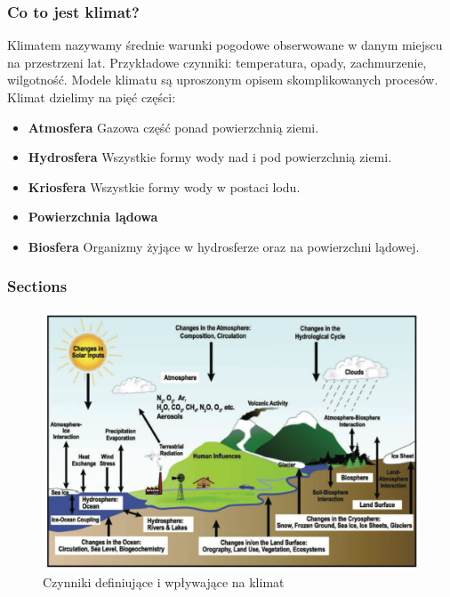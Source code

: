 \documentclass{beamer}
\begin{document}
\begin{frame}
\frametitle{Co to jest klimat?}
Klimatem nazywamy średnie warunki pogodowe obserwowane w danym miejscu na przestrzeni lat. Przykładowe czynniki: temperatura, opady, zachmurzenie, wilgotność.
Modele klimatu są uproszonym opisem skomplikowanych procesów.
Klimat dzielimy na pięć części:
\begin{itemize}
	\item \textbf{Atmosfera} Gazowa część ponad powierzchnią ziemi.
	\item \textbf{Hydrosfera} Wszystkie formy wody nad i pod powierzchnią ziemi.
	\item \textbf{Kriosfera} Wszystkie formy wody w postaci lodu.
	\item \textbf{Powierzchnia lądowa}
	\item \textbf{Biosfera} Organizmy żyjące w hydrosferze oraz na powierzchni lądowej.
\end{itemize}
\end{frame}


\begin{frame}[fragile]
	\frametitle{Sections}
	\begin{figure}[h]
		\begin{center}
			\includegraphics[width=0.7\linewidth]{images/Figure1}
			\caption{Czynniki definiujące i wpływające na klimat}
		\end{center}
	\end{figure}
\end{frame}
\end{document}
